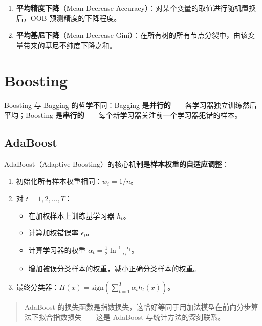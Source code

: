 \documentclass[
]{book}
\providecommand{\tightlist}{%
  \setlength{\itemsep}{0pt}\setlength{\parskip}{0pt}}
\begin{document}
\begin{enumerate}
\def\labelenumi{\arabic{enumi}.}
\tightlist
\item
  \textbf{平均精度下降}（Mean Decrease Accuracy）：对某个变量的取值进行随机置换后，OOB 预测精度的下降程度。
\item
  \textbf{平均基尼下降}（Mean Decrease Gini）：在所有树的所有节点分裂中，由该变量带来的基尼不纯度下降之和。
\end{enumerate}

\section{Boosting}\label{boosting}

Boosting 与 Bagging 的哲学不同：Bagging 是\textbf{并行的}------各学习器独立训练然后平均；Boosting 是\textbf{串行的}------每个新学习器关注前一个学习器犯错的样本。

\subsection{AdaBoost}\label{adaboost}

AdaBoost（Adaptive Boosting）的核心机制是\textbf{样本权重的自适应调整}：

\begin{enumerate}
\def\labelenumi{\arabic{enumi}.}
\tightlist
\item
  初始化所有样本权重相同：\(w_i = 1/n\)。
\item
  对 \(t = 1, 2, \ldots, T\)：

  \begin{itemize}
  \tightlist
  \item
    在加权样本上训练基学习器 \(h_t\)。
  \item
    计算加权错误率 \(\epsilon_t\)。
  \item
    计算学习器的权重 \(\alpha_t = \frac{1}{2} \ln \frac{1 - \epsilon_t}{\epsilon_t}\)。
  \item
    增加被误分类样本的权重，减小正确分类样本的权重。
  \end{itemize}
\item
  最终分类器：\(H(x) = \text{sign}\left(\sum_{t=1}^T \alpha_t h_t(x)\right)\)。
\end{enumerate}

\begin{quote}
AdaBoost 的损失函数是指数损失，这恰好等同于用加法模型在前向分步算法下拟合指数损失------这是 AdaBoost 与统计方法的深刻联系。
\end{quote}
\end{document}
